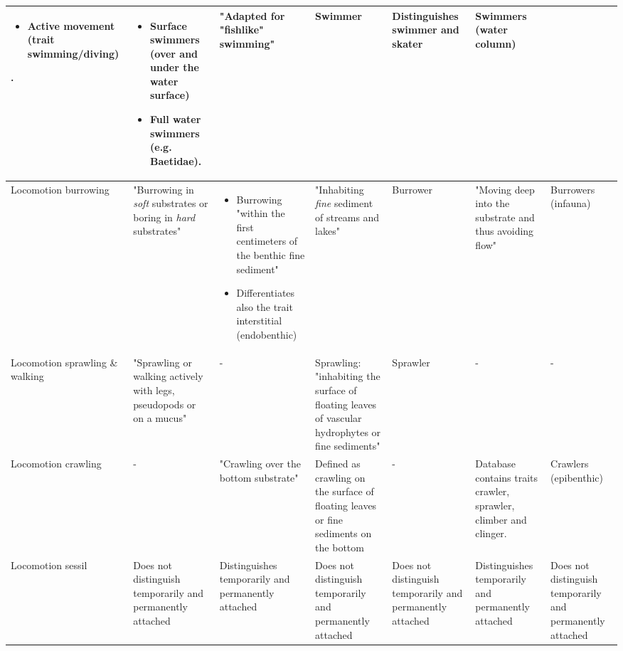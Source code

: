 \documentclass[../Draft_harmonization_paper.tex]{subfiles}
\begin{document}
\begin{landscape}
\begin{longtable}{m{1.8cm}|m{3cm}|m{3cm}|m{3cm}|m{3cm}|m{3.2cm}|m{3cm}}
\begin{itemize}
            \item Active movement (trait swimming/diving)
        \end{itemize}. &
        \begin{itemize}
            \item Surface swimmers (over and under the water surface)
            \item Full water swimmers (e.g. Baetidae).
        \end{itemize} & 
        "Adapted for "fishlike" swimming" & 
        Swimmer & 
        Distinguishes swimmer and skater & 
        Swimmers (water column)
        \\
        \midrule
        Locomotion burrowing & 
        "Burrowing in \textit{soft} substrates or boring in \textit{hard} substrates" & 
        \begin{itemize}
            \item Burrowing "within the first centimeters of the benthic fine sediment"
            \item Differentiates also the trait interstitial (endobenthic)
        \end{itemize} & 
        "Inhabiting \textit{fine} sediment of streams and lakes" &
        Burrower & 
        "Moving deep into the substrate and thus avoiding flow" &
        Burrowers (infauna)
        \\
        \midrule
        Locomotion sprawling \& walking & 
        "Sprawling or walking actively with legs, pseudopods or on a mucus" &
        - & 
        Sprawling: "inhabiting the surface of floating leaves of vascular hydrophytes or fine sediments" & 
        Sprawler &
        - & 
        - \\
        \midrule
        Locomotion crawling & 
        - &
        "Crawling over the bottom substrate" & 
        Defined as crawling on the surface of floating leaves or fine sediments on the bottom & 
        - & 
        Database contains traits crawler, 
        sprawler, climber and clinger. &
        Crawlers (epibenthic) \\
        \midrule
        Locomotion sessil & 
        Does not distinguish temporarily and permanently attached & 
        Distinguishes temporarily and permanently attached & 
        Does not distinguish temporarily and permanently attached & 
        Does not distinguish temporarily and permanently attached & 
        Distinguishes temporarily and permanently attached & 
        Does not distinguish temporarily and permanently attached \\

\end{longtable}
\end{landscape}
\end{document}
